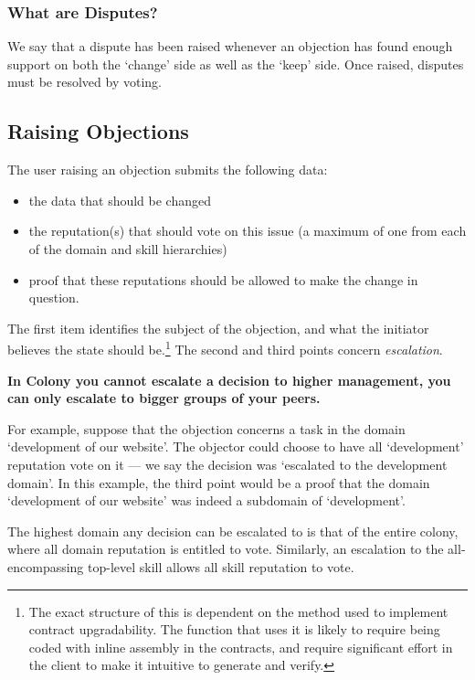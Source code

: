 \subsubsection*{What are Disputes?}
We say that a dispute has been raised whenever an objection has found enough support on both the `change' side as well as the `keep' side. Once raised, disputes must be resolved by voting. 

\subsection{Raising Objections}\label{subsec:raising-objections}

The user raising an objection submits the following data:
\begin{itemize}
 \item the data that should be changed
 \item the reputation(s) that should vote on this issue (a maximum of one from each of the domain and skill hierarchies)
 \item proof that these reputations should be allowed to make the change in question. 
\end{itemize}

The first item identifies the subject of the objection, and what the initiator believes the state should be.\footnote{The exact structure of this is dependent on the method used to implement contract upgradability. The function that uses it is likely to require being coded with inline assembly in the contracts, and require significant effort in the client to make it intuitive to generate and verify.} The second and third points concern \emph{escalation}. 

\begin{center}
 \textbf{In Colony you cannot escalate a decision to higher management, you can only escalate to bigger groups of your peers.}
\end{center}

For example, suppose that the objection concerns a task in the domain `development of our website'. The objector could choose to have all `development' reputation vote on it --- we say the decision was `escalated to the development domain'. In this example, the third point would be a proof that the domain `development of our website' was indeed a subdomain of `development'.

The highest domain any decision can be escalated to is that of the entire colony, where all domain reputation is entitled to vote. Similarly, an escalation to the all-encompassing top-level skill allows all skill reputation to vote.

